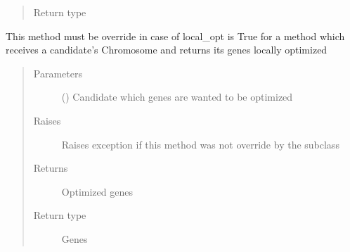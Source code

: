 \documentclass[letterpaper,10pt,english]{sphinxmanual}
\begin{document}
\begin{fulllineitems}
\begin{fulllineitems}
\begin{quote}
\begin{description}
\item[{Return type}] \leavevmode
\sphinxAtStartPar
{\hyperref[\detokenize{genetic:genetic.Chromosome}]{}}

\end{description}\end{quote}

\end{fulllineitems}


\begin{fulllineitems}
\label{\detokenize{genetic:genetic.Genetic.local_optimize}}
\sphinxAtStartPar
This method must be override in case of local\_opt is True for a method which receives a candidate’s
Chromosome and returns its genes locally optimized
\begin{quote}\begin{description}
\item[{Parameters}] \leavevmode
\sphinxAtStartPar
{} ({\hyperref[\detokenize{genetic:genetic.Chromosome}]{}}) \textendash{} Candidate which genes are wanted to be optimized

\item[{Raises}] \leavevmode
\sphinxAtStartPar
{} \textendash{} Raises exception if this method was not override by the subclass

\item[{Returns}] \leavevmode
\sphinxAtStartPar
Optimized genes

\item[{Return type}] \leavevmode
\sphinxAtStartPar
Genes

\end{description}\end{quote}

\end{fulllineitems}



\end{fulllineitems}
\end{document}
